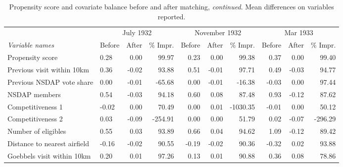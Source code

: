 \begin{table}[t!]
\centering
\caption{Propensity score and covariate balance before and after matching, \textit{continued}. Mean differences on variables reported.\label{tab:balance2}} 
\begingroup\scriptsize
\begin{tabular}{llrrrrrrrr}
  \toprule
   & \multicolumn{3}{c}{July 1932} &  \multicolumn{3}{c}{November 1932} & \multicolumn{3}{c}{Mar 1933}\\\cmidrule(r){2-4} \cmidrule(r){5-7} \cmidrule(r){8-10}\textit{Variable names} & Before & After & \% Impr. & Before & After & \% Impr. & Before & After & \% Impr.\\ \midrule
Propensity score &  0.28 &  0.00 &   99.97 &  0.23 &  0.00 &    99.38 &  0.37 &  0.00 &   99.40 \\ 
  Previous visit within 10km &  0.36 & -0.02 &   93.88 &  0.51 & -0.01 &    97.71 &  0.49 & -0.03 &   94.77 \\ 
  Previous NSDAP vote share &  0.00 & -0.01 &  -65.68 &  0.00 & -0.01 &   -16.38 & -0.03 &  0.00 &   97.44 \\ 
  NSDAP members &  0.54 & -0.03 &   94.18 &  0.60 &  0.08 &    87.48 &  0.93 & -0.12 &   87.62 \\ 
  Competitiveness 1 & -0.02 &  0.00 &   70.49 &  0.00 &  0.01 & -1030.35 & -0.01 &  0.00 &   50.12 \\ 
  Competitiveness 2 &  0.03 & -0.09 & -254.91 &  0.00 &  0.00 &    51.79 &  0.02 & -0.07 & -296.29 \\ 
  Number of eligibles &  0.55 &  0.03 &   93.89 &  0.66 &  0.04 &    94.62 &  1.09 & -0.12 &   89.42 \\ 
  Distance to nearest airfield & -0.16 & -0.02 &   90.55 & -0.19 & -0.02 &    90.36 & -0.32 &  0.02 &   93.88 \\ 
  Goebbels visit within 10km &  0.20 &  0.01 &   97.26 &  0.13 &  0.01 &    90.88 &  0.36 &  0.08 &   78.86 \\ 
   \bottomrule
\end{tabular}
\endgroup
\end{table}
